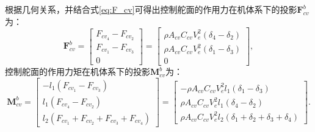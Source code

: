 根据几何关系，并结合式\eqref{eq:F_cv}可得出控制舵面的作用力在机体系下的投影$\bm{F}_{cv}^b$为：
\begin{equation}
    \bm{F}_{cv}^b = 
    \begin{bmatrix}
        F_{cv_{4}} - F_{cv_{2}} \\
        F_{cv_{1}} - F_{cv_{3}} \\
        0
    \end{bmatrix} = 
    \begin{bmatrix}
        \rho A_{cv} C_{cv} V_e^2 (\delta _4 - \delta _2) \\
        \rho A_{cv} C_{cv} V_e^2 (\delta _1 - \delta _3) \\
        0
    \end{bmatrix},
    \label{eq:F_cv}
\end{equation}
控制舵面的作用力矩在机体系下的投影$\bm{M}_{cv}^b$为：
\begin{equation}
    \bm{M}_{cv}^b = 
    \begin{bmatrix}
        -l_1 (F_{cv_{1}} - F_{cv_{3}}) \\
        l_1 (F_{cv_{4}} - F_{cv_{2}}) \\
        l_2 (F_{cv_{1}} + F_{cv_{2}} + F_{cv_{3}} + F_{cv_{4}})
    \end{bmatrix} = 
    \begin{bmatrix}
        -\rho A_{cv} C_{cv} V_e^2 l_1 (\delta _1 - \delta _3) \\
        \rho A_{cv} C_{cv} V_e^2 l_1 (\delta _4 - \delta _2) \\
        \rho A_{cv} C_{cv} V_e^2 l_2 (\delta _1 + \delta _2 + \delta _3 + \delta _4)
    \end{bmatrix}.
    \label{eq:M_cv}
\end{equation}

